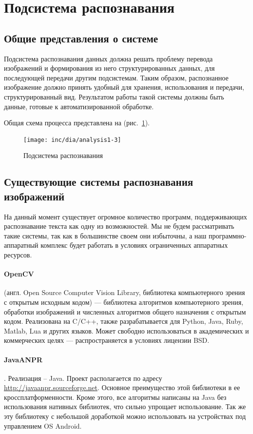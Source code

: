 \section{Подсистема распознавания}
\subsection{Общие представления о системе}

Подсистема распознавания данных должна решать проблему перевода изображений и формирования из него структурированных данных, для последующей передачи другим подсистемам. Таким образом, распознанное изображение должно принять удобный для хранения, использования и передачи, структурированный вид. Результатом работы такой системы должны быть данные, готовые к автоматизированной обработке. 

Общая схема процесса представлена на (рис.~\ref{fig:fig03}).
\begin{figure}[ht]
	\centering
	\texttt{[image: inc/dia/analysis1-3]}
	\caption{Подсистема распознавания}
  \label{fig:fig03}
\end{figure}

\subsection{Существующие системы распознавания изображений}

На данный момент существует огромное количество программ, поддерживающих распознавание текста как одну из возможностей. Мы не будем рассматривать такие системы, так как в большинстве своем они избыточны, а наш программно-аппаратный комплекс будет работать в условиях ограниченных аппаратных ресурсов.

\paragraph{OpenCV} (англ. Open Source Computer Vision Library, библиотека компьютерного зрения с открытым исходным кодом) — библиотека алгоритмов компьютерного зрения, обработки изображений и численных алгоритмов общего назначения с открытым кодом. Реализована на C/C++, также разрабатывается для Python, Java, Ruby, Matlab, Lua и других языков. Может свободно использоваться в академических и коммерческих целях — распространяется в условиях лицензии BSD.

\paragraph{JavaANPR}. Реализация – Java. Проект располагается по адресу \url{http://javaanpr.sourceforge.net}. Основное преимущество этой библиотеки в ее кроссплатформенности. Кроме этого, все алгоритмы написаны на Java без использования нативных библиотек, что сильно упрощает использование. Так же эту библиотеку с небольшой доработкой можно использовать на устройствах под управлением OS Android.

